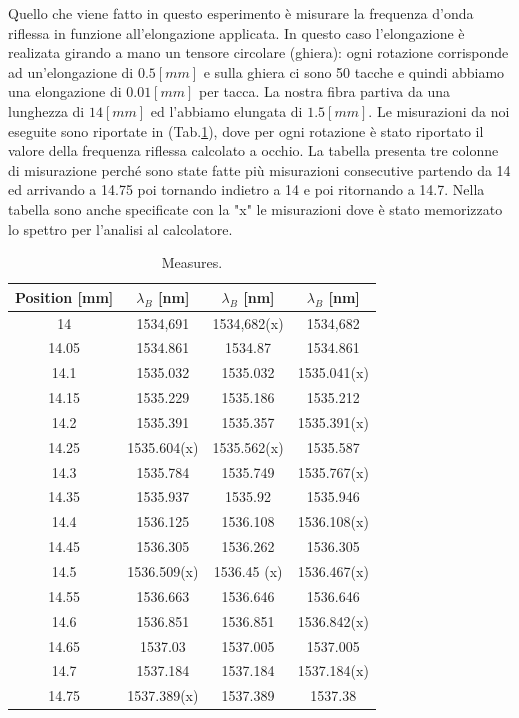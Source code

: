 Quello che viene fatto in questo esperimento è misurare la frequenza d'onda riflessa in funzione all'elongazione applicata. In questo caso l'elongazione è realizata girando a mano un tensore circolare (ghiera): ogni rotazione corrisponde ad un'elongazione di $0.5[mm]$ e sulla ghiera ci sono 50 tacche e quindi abbiamo una elongazione di $0.01[mm]$ per tacca. La nostra fibra partiva da una lunghezza di $14[mm]$ ed l'abbiamo elungata di $1.5[mm]$. Le misurazioni da noi eseguite sono riportate in (Tab.\ref{table:measures}), dove per ogni rotazione è stato riportato il valore della frequenza riflessa calcolato a occhio. La tabella presenta tre colonne di misurazione perché sono state fatte più misurazioni consecutive partendo da 14 ed arrivando a 14.75 poi tornando indietro a 14 e poi ritornando a 14.7. Nella tabella sono anche specificate con la "x" le misurazioni dove è stato memorizzato lo spettro per l'analisi al calcolatore.
\begin{table}[h]
  \begin{tabular}{c|c|c|c}
      Position [mm]  &  $\lambda_B$  [nm]  &  $\lambda_B$  [nm]  &  $\lambda_B$  [nm]  \\
      \hline
      14     &  1534,691     &  1534,682(x)  &  1534,682     \\
      14.05  &  1534.861     &  1534.87      &  1534.861     \\
      14.1   &  1535.032     &  1535.032     &  1535.041(x)  \\
      14.15  &  1535.229     &  1535.186     &  1535.212     \\
      14.2   &  1535.391     &  1535.357     &  1535.391(x)  \\
      14.25  &  1535.604(x)  &  1535.562(x)  &  1535.587     \\
      14.3   &  1535.784     &  1535.749     &  1535.767(x)  \\
      14.35  &  1535.937     &  1535.92      &  1535.946     \\
      14.4   &  1536.125     &  1536.108     &  1536.108(x)  \\
      14.45  &  1536.305     &  1536.262     &  1536.305     \\
      14.5   &  1536.509(x)  &  1536.45 (x)  &  1536.467(x)  \\
      14.55  &  1536.663     &  1536.646     &  1536.646     \\
      14.6   &  1536.851     &  1536.851     &  1536.842(x)  \\
      14.65  &  1537.03      &  1537.005     &  1537.005     \\
      14.7   &  1537.184     &  1537.184     &  1537.184(x)  \\
      14.75  &  1537.389(x)  &  1537.389     &  1537.38      \\

  \end{tabular}
  \caption{Measures.}
  \label{table:measures}
\end{table}
